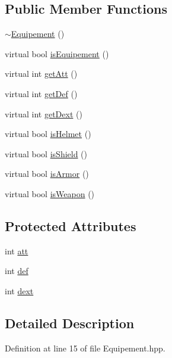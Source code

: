 \subsection*{Public Member Functions}
\begin{DoxyCompactItemize}
\item 
\hyperlink{class_equipement_ae7751a52f2665d9e4b3e2cd6929bd986}{$\sim$\-Equipement} ()
\item 
virtual bool \hyperlink{class_equipement_af610185f2c5de11ca0bc2a8ce2a33ca7}{is\-Equipement} ()
\item 
virtual int \hyperlink{class_equipement_ab546b168d8f5b54e284edf4ab1ae83d4}{get\-Att} ()
\item 
virtual int \hyperlink{class_equipement_a241facc1b1535325159466841f2f33b0}{get\-Def} ()
\item 
virtual int \hyperlink{class_equipement_abb2fa5ce2ae0f4c09a1629ccd6f2712f}{get\-Dext} ()
\item 
virtual bool \hyperlink{class_equipement_a365519a07bd4174fd2f2d7599d7bb958}{is\-Helmet} ()
\item 
virtual bool \hyperlink{class_equipement_a54df0547364f60076567ebd92d901d35}{is\-Shield} ()
\item 
virtual bool \hyperlink{class_equipement_a58257744d709a3f7889e319ba40417b1}{is\-Armor} ()
\item 
virtual bool \hyperlink{class_equipement_a9a35cf9e1f015bf4c5e943c494fbe09b}{is\-Weapon} ()
\end{DoxyCompactItemize}
\subsection*{Protected Attributes}
\begin{DoxyCompactItemize}
\item 
int \hyperlink{class_equipement_ac47f0f7d35dfea97ce2d39b58b4fa4c3}{att}
\item 
int \hyperlink{class_equipement_a752a20a1c7af822f8ad4415a446c6560}{def}
\item 
int \hyperlink{class_equipement_a35089a4e7aeec9c99d57882e363284ee}{dext}
\end{DoxyCompactItemize}


\subsection{Detailed Description}


Definition at line 15 of file Equipement.\-hpp.



